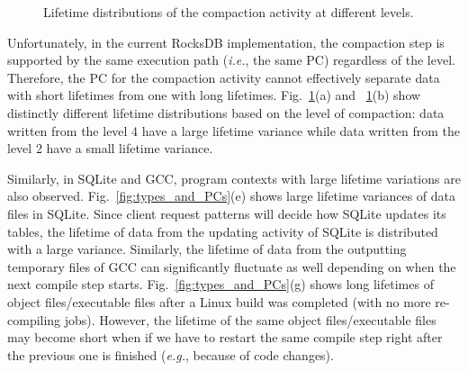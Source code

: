 \begin{figure}[!t]
\centering
{}  %
	\hspace{10pt}
\caption{Lifetime distributions of the compaction activity at different levels.} %
\label{fig:compaction}
\end{figure}




Unfortunately, in the current RocksDB implementation, the compaction step is supported 
by the same execution path ({\it i.e.}, the same PC) regardless of the level.
Therefore, the PC for the compaction activity cannot effectively separate data with 
short lifetimes from one with long lifetimes.
Fig.~\ref{fig:compaction}(a) and ~\ref{fig:compaction}(b) show
distinctly different lifetime distributions based on the level of compaction:
data written from the level 4 have a large lifetime variance while data written from
the level 2 have a small lifetime variance.

Similarly, in SQLite and GCC, program contexts with large lifetime variations
are also observed.
Fig.~\ref{fig:types_and_PCs}(e) shows large lifetime variances of data files in
SQLite.
Since client request patterns will decide how SQLite updates its tables, 
the lifetime of data from the updating activity of SQLite is distributed 
with a large variance.  Similarly, the lifetime of
data from the outputting temporary files of GCC can significantly fluctuate 
as well depending on when the next compile step starts.   
Fig.~\ref{fig:types_and_PCs}(g) shows long lifetimes of 
object files/executable files after 
a Linux build was completed
(with no more re-compiling jobs).
However, the lifetime of the same object files/executable files 
may become short when if we have to restart the same
compile step right after the previous one is finished
({\it e.g.}, because of code changes).

